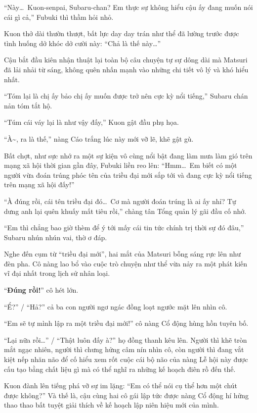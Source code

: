 \documentclass[../main.tex]{subfiles}
\begin{document}
``Này\dots\ Kuon-senpai, Subaru-chan? Em thực sự không hiểu cậu ấy đang muốn nói cái gì cả,'' Fubuki thì thầm hỏi nhỏ.

Kuon thở dài thườn thượt, bất lực day day trán như thể đã lường trước được tình huống dở khóc dở cười này: ``Chả là thế này\dots''

\ct

Cậu bắt đầu kiên nhận thuật lại toàn bộ câu chuyện tự sự dông dài mà Matsuri đã lải nhải từ sáng, không quên nhấn mạnh vào những chi tiết vô lý và khó hiểu nhất.

``Tóm lại là chị ấy bảo chị ấy muốn được trở nên cực kỳ nổi tiếng,'' Subaru chán nản tóm tắt hộ.

``Túm cái váy lại là như vậy đấy,'' Kuon gật đầu phụ họa.

``À\~{}, ra là thế,'' nàng Cáo trắng lúc này mới vỡ lẽ, khẽ gật gù.

Bất chợt, như sực nhớ ra một sự kiện vô cùng nổi bật đang làm mưa làm gió trên mạng xã hội thời gian gần đây, Fubuki liền reo lên: ``Hmm\dots\ Em biết có một người vừa đoán trúng phóc tên của triều đại mới sắp tới và đang cực kỳ nổi tiếng trên mạng xã hội đấy!''

``À đúng rồi, cái tên triều đại đó\dots\ Cơ mà người đoán trúng là ai ấy nhỉ? Tự dưng anh lại quên khuấy mất tiêu rồi,'' chàng tân Tổng quản lý gãi đầu cố nhớ.

``Em thì chẳng bao giờ thèm để ý tới mấy cái tin tức chính trị thời sự đó đâu,'' Subaru nhún nhún vai, thờ ơ đáp.

Nghe đến cụm từ ``triều đại mới'', hai mắt của Matsuri bỗng sáng rực lên như đèn pha. Cô nàng lao bổ vào cuộc trò chuyện như thể vừa nảy ra một phát kiến vĩ đại nhất trong lịch sử nhân loại.

``\textbf{Đúng rồi!}'' cô hét lớn.

``Ể?'' / ``Hả?'' cả ba con người ngơ ngác đồng loạt ngước mặt lên nhìn cô.

``Em sẽ tự mình lập ra một triều đại mới!'' cô nàng Cổ động hùng hồn tuyên bố.

``Lại nữa rồi\dots'' / ``Thật luôn đấy à?'' họ đồng thanh kêu lên. Người thì khẽ tròn mắt ngạc nhiên, người thì chưng hửng câm nín nhìn cô, còn người thì đang vắt kiệt nếp nhăn não để cố hiểu xem rốt cuộc cái bộ não của nàng Lễ hội này được cấu tạo bằng chất liệu gì mà có thể nghĩ ra những kế hoạch điên rồ đến thế.

Kuon đành lên tiếng phá vỡ sự im lặng: ``Em có thể nói cụ thể hơn một chút được không?'' Và thế là, cậu cùng hai cô gái lập tức được nàng Cổ động hí hửng thao thao bất tuyệt giải thích về kế hoạch lập niên hiệu mới của mình.
\end{document}

